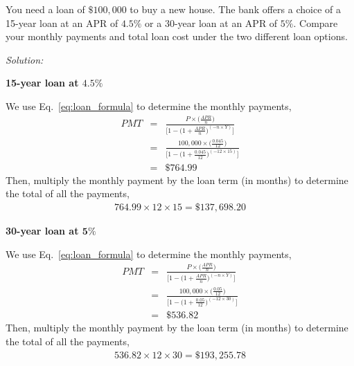 \documentclass[12pt]{article}
\begin{document}
\pagebreak

You need a loan of $\$100,000$ to buy a new house.  The bank offers a choice of a 15-year loan at an APR of $4.5\%$ or a 30-year loan at an APR of $5\%$.  Compare your monthly payments and total loan cost under the two different loan options.

{\it Solution:

{\bf 15-year loan at $\mathbf{4.5\%}$}

We use Eq.~\eqref{eq:loan_formula} to determine the monthly payments,
\begin{eqnarray*}
	PMT &=& \frac{P\times \Big(\frac{APR}{n} \Big)}{\Big[1 - \Big(1 + \frac{APR}{n}\Big)^{(-n\times Y)}\Big]} \\
	&=& \frac{100,000\times \Big(\frac{0.045}{12} \Big)}{\Big[1 - \Big(1 + \frac{0.045}{12}\Big)^{(-12\times 15)}\Big]} \\
	&=& \$764.99
\end{eqnarray*}
Then, multiply the monthly payment by the loan term (in months) to determine the total of all the payments,
\begin{eqnarray*}
	764.99 \times 12 \times 15 = \$137,698.20
\end{eqnarray*}

\vskip 10pt

{\bf 30-year loan at $\mathbf{5\%}$}

We use Eq.~\eqref{eq:loan_formula} to determine the monthly payments,
\begin{eqnarray*}
	PMT &=& \frac{P\times \Big(\frac{APR}{n} \Big)}{\Big[1 - \Big(1 + \frac{APR}{n}\Big)^{(-n\times Y)}\Big]} \\
	&=& \frac{100,000\times \Big(\frac{0.05}{12} \Big)}{\Big[1 - \Big(1 + \frac{0.05}{12}\Big)^{(-12\times 30)}\Big]} \\
	&=& \$536.82
\end{eqnarray*}
Then, multiply the monthly payment by the loan term (in months) to determine the total of all the payments,
\begin{eqnarray*}
	536.82 \times 12 \times 30 = \$193,255.78
\end{eqnarray*}

}
\end{document}
